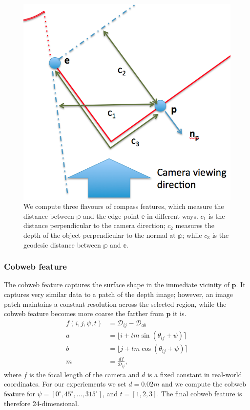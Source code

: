 \documentclass[10pt,twocolumn,letterpaper]{article}
\newcommand{\point}{\mathbf{p}}
\newcommand{\degree}{^{\circ}}
\newcommand{\rgbdimage}{\mathcal{D}}
\begin{document}
\begin{figure}
    \centering 
    \includegraphics[width=1.0\columnwidth]{compass_features}
    \caption{We compute three flavours of compass features, which measure the distance between $\mathbb{p}$ and the edge point $\mathbb{e}$ in different ways. $c_1$ is the distance perpendicular to the camera direction; $c_2$ measures the depth of the object perpendicular to the normal at $\mathbb{p}$; while $c_3$ is the geodesic distance between $\mathbb{p}$ and $\mathbb{e}$.}
    \label{fig:compass_features}
\end{figure}


\subsubsection{Cobweb feature}
The cobweb feature captures the surface shape in the immediate vicinity of $\point$. 
It captures very similar data to a patch of the depth image; however, an image patch maintains a constant resolution across the selected region, while the cobweb feature becomes more coarse the farther from $\point$ it is.
\begin{align}
f(i, j, \psi, t) &= \rgbdimage_{ij} - \rgbdimage_{ab} \\
a &= \lfloor i + tm\sin(\theta_{ij}+\psi)\rceil \\
b &= \lfloor j + tm\cos(\theta_{ij}+\psi)\rceil \\
m &= \frac{df}{\rgbdimage_{ij}},
\end{align}
where $f$ is the focal length of the camera and $d$ is a fixed constant in real-world coordinates. For our experiements we set $d=0.02m$ and we compute the cobweb feature for $\psi = [0\degree, 45\degree, \ldots, 315\degree]$, and $t = [1, 2, 3]$. 
The final cobweb feature is therefore 24-dimensional.
\end{document}
